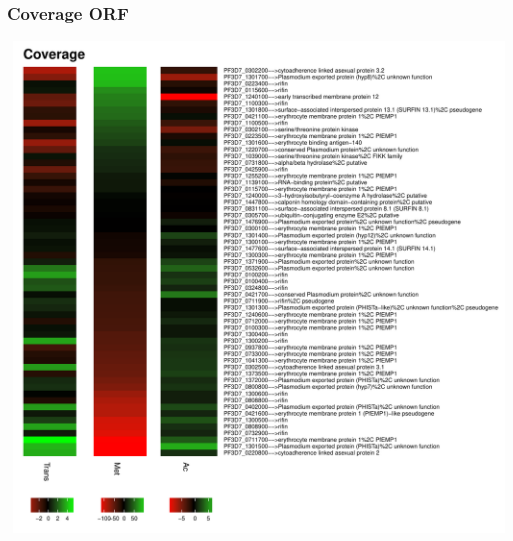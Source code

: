 \documentclass{article}\usepackage[]{graphicx}\usepackage[]{color}
\newenvironment{knitrout}{}{} %
\begin{document}
\subsubsection{Coverage ORF}
\begin{knitrout}
\color{fgcolor}

{\centering \includegraphics[width=20cm,height=13cm]{figure/minimal-met_cov_ORF-1} 

}



\end{knitrout}
\clearpage
\end{document}
